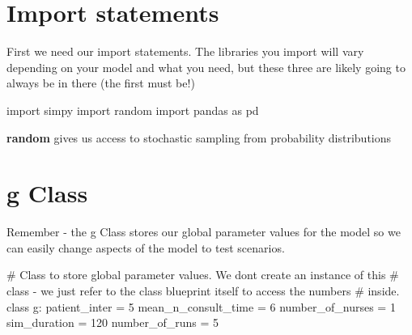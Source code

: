 \documentclass[
  letterpaper,
  DIV=11,
  numbers=noendperiod]{scrreprt}
\newenvironment{Shaded}{\begin{snugshade}}{\end{snugshade}}
\newcommand{\CommentTok}[1]{\textcolor[rgb]{0.37,0.37,0.37}{#1}}
\newcommand{\DecValTok}[1]{\textcolor[rgb]{0.68,0.00,0.00}{#1}}
\newcommand{\ImportTok}[1]{\textcolor[rgb]{0.00,0.46,0.62}{#1}}
\newcommand{\KeywordTok}[1]{\textcolor[rgb]{0.00,0.23,0.31}{#1}}
\newcommand{\NormalTok}[1]{\textcolor[rgb]{0.00,0.23,0.31}{#1}}
\newcommand{\OperatorTok}[1]{\textcolor[rgb]{0.37,0.37,0.37}{#1}}
\begin{document}
\section{Import statements}\label{import-statements}

First we need our import statements. The libraries you import will vary
depending on your model and what you need, but these three are likely
going to always be in there (the first must be!)

\begin{Shaded}
\begin{Highlighting}[]
\ImportTok{import}\NormalTok{ simpy}
\ImportTok{import}\NormalTok{ random}
\ImportTok{import}\NormalTok{ pandas }\ImportTok{as}\NormalTok{ pd}
\end{Highlighting}
\end{Shaded}

\begin{tcolorbox}[enhanced jigsaw, rightrule=.15mm, colback=white, colframe=quarto-callout-tip-color-frame, colbacktitle=quarto-callout-tip-color!10!white, toprule=.15mm, coltitle=black, opacityback=0, titlerule=0mm, bottomtitle=1mm, breakable, title=\textcolor{quarto-callout-tip-color}{\faLightbulb}\hspace{0.5em}{Tip}, opacitybacktitle=0.6, toptitle=1mm, arc=.35mm, bottomrule=.15mm, leftrule=.75mm, left=2mm]

\textbf{random} gives us access to stochastic sampling from probability
distributions

\end{tcolorbox}

\section{g Class}\label{g-class-1}

Remember - the g Class stores our global parameter values for the model
so we can easily change aspects of the model to test scenarios.

\begin{Shaded}
\begin{Highlighting}[]
\CommentTok{\# Class to store global parameter values.  We don\textquotesingle{}t create an instance of this}
\CommentTok{\# class {-} we just refer to the class blueprint itself to access the numbers}
\CommentTok{\# inside.}
\KeywordTok{class}\NormalTok{ g:}
\NormalTok{    patient\_inter }\OperatorTok{=} \DecValTok{5}
\NormalTok{    mean\_n\_consult\_time }\OperatorTok{=} \DecValTok{6}
\NormalTok{    number\_of\_nurses }\OperatorTok{=} \DecValTok{1}
\NormalTok{    sim\_duration }\OperatorTok{=} \DecValTok{120}
\NormalTok{    number\_of\_runs }\OperatorTok{=} \DecValTok{5}
\end{Highlighting}
\end{Shaded}
\end{document}
